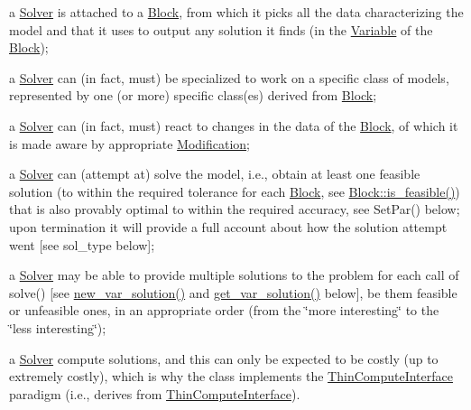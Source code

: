 \begin{DoxyItemize}
\item a \mbox{\hyperlink{class_s_m_spp__di__unipi__it_1_1_solver}{Solver}} is attached to a \mbox{\hyperlink{class_s_m_spp__di__unipi__it_1_1_block}{Block}}, from which it picks all the data characterizing the model and that it uses to output any solution it finds (in the \mbox{\hyperlink{class_s_m_spp__di__unipi__it_1_1_variable}{Variable}} of the \mbox{\hyperlink{class_s_m_spp__di__unipi__it_1_1_block}{Block}});
\item a \mbox{\hyperlink{class_s_m_spp__di__unipi__it_1_1_solver}{Solver}} can (in fact, must) be specialized to work on a specific class of models, represented by one (or more) specific class(es) derived from \mbox{\hyperlink{class_s_m_spp__di__unipi__it_1_1_block}{Block}};
\item a \mbox{\hyperlink{class_s_m_spp__di__unipi__it_1_1_solver}{Solver}} can (in fact, must) react to changes in the data of the \mbox{\hyperlink{class_s_m_spp__di__unipi__it_1_1_block}{Block}}, of which it is made aware by appropriate \mbox{\hyperlink{class_s_m_spp__di__unipi__it_1_1_modification}{Modification}};
\item a \mbox{\hyperlink{class_s_m_spp__di__unipi__it_1_1_solver}{Solver}} can (attempt at) solve the model, i.\+e., obtain at least one feasible solution (to within the required tolerance for each \mbox{\hyperlink{class_s_m_spp__di__unipi__it_1_1_block}{Block}}, see \mbox{\hyperlink{class_s_m_spp__di__unipi__it_1_1_block_a4204ffb542117f4ea97eeceeda4da079}{Block\+::is\+\_\+feasible()}}) that is also provably optimal to within the required accuracy, see Set\+Par() below; upon termination it will provide a full account about how the solution attempt went \mbox{[}see sol\+\_\+type below\mbox{]};
\item a \mbox{\hyperlink{class_s_m_spp__di__unipi__it_1_1_solver}{Solver}} may be able to provide multiple solutions to the problem for each call of solve() \mbox{[}see \mbox{\hyperlink{class_s_m_spp__di__unipi__it_1_1_solver_af109b504a566c90a4ea45c1574c128fe}{new\+\_\+var\+\_\+solution()}} and \mbox{\hyperlink{class_s_m_spp__di__unipi__it_1_1_solver_a91d7cd0dc4fa453406ef30db2bfa37a5}{get\+\_\+var\+\_\+solution()}} below\mbox{]}, be them feasible or unfeasible ones, in an appropriate order (from the \char`\"{}more interesting\char`\"{} to the \char`\"{}less interesting\char`\"{});
\item a \mbox{\hyperlink{class_s_m_spp__di__unipi__it_1_1_solver}{Solver}} compute solutions, and this can only be expected to be costly (up to extremely costly), which is why the class implements the \mbox{\hyperlink{class_s_m_spp__di__unipi__it_1_1_thin_compute_interface}{Thin\+Compute\+Interface}} paradigm (i.\+e., derives from \mbox{\hyperlink{class_s_m_spp__di__unipi__it_1_1_thin_compute_interface}{Thin\+Compute\+Interface}}).
\end{DoxyItemize}

